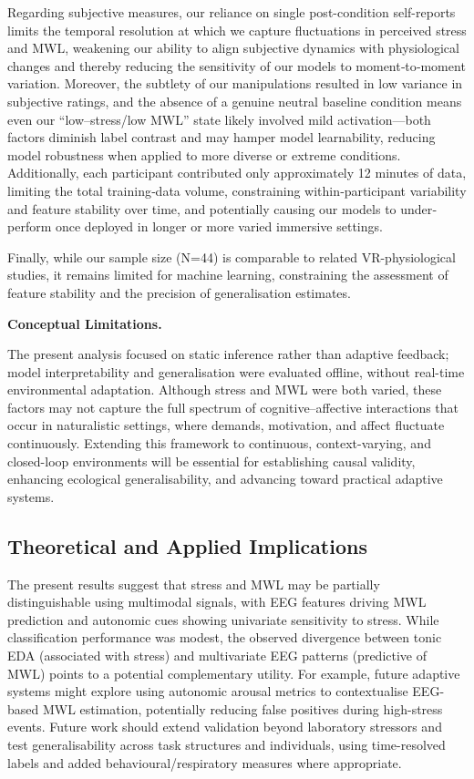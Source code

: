\documentclass[lettersize,journal]{IEEEtran}
\begin{document}
Regarding subjective measures, our reliance on single post-condition self-reports limits the temporal resolution at which we capture fluctuations in perceived stress and MWL, weakening our ability to align subjective dynamics with physiological changes and thereby reducing the sensitivity of our models to moment‐to‐moment variation. Moreover, the subtlety of our manipulations resulted in low variance in subjective ratings, and the absence of a genuine neutral baseline condition means even our “low–stress/low MWL” state likely involved mild activation—both factors diminish label contrast and may hamper model learnability, reducing model robustness when applied to more diverse or extreme conditions.  Additionally, each participant contributed only approximately 12 minutes of data, limiting the total training‐data volume, constraining within‐participant variability and feature stability over time, and potentially causing our models to under‐perform once deployed in longer or more varied immersive settings.

Finally, while our sample size (N=44) is comparable to related VR-physiological studies, it remains limited for machine learning, constraining the assessment of feature stability and the precision of generalisation estimates.


\textbf{Conceptual Limitations.} 

The present analysis focused on static inference rather than adaptive feedback; model interpretability and generalisation were evaluated offline, without real-time environmental adaptation. 
Although stress and MWL were both varied, these factors may not capture the full spectrum of cognitive–affective interactions that occur in naturalistic settings, where demands, motivation, and affect fluctuate continuously. 
Extending this framework to continuous, context-varying, and closed-loop environments will be essential for establishing causal validity, enhancing ecological generalisability, and advancing toward practical adaptive systems.


\subsection{Theoretical and Applied Implications}

The present results suggest that stress and MWL may be partially distinguishable using multimodal signals, with EEG features driving MWL prediction and autonomic cues showing univariate sensitivity to stress. While classification performance was modest, the observed divergence between tonic EDA (associated with stress) and multivariate EEG patterns (predictive of MWL) points to a potential complementary utility. For example, future adaptive systems might explore using autonomic arousal metrics to contextualise EEG-based MWL estimation, potentially reducing false positives during high-stress events. Future work should extend validation beyond laboratory stressors and test generalisability across task structures and individuals, using time-resolved labels and added behavioural/respiratory measures where appropriate.
\end{document}
